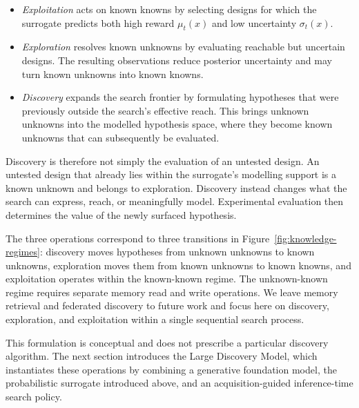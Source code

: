 \begin{itemize}[leftmargin=1.6em,itemsep=2pt,topsep=2pt]
    \item \emph{Exploitation} acts on known knowns by selecting designs for
    which the surrogate predicts both high reward $\mu_t(x)$ and low
    uncertainty $\sigma_t(x)$.

    \item \emph{Exploration} resolves known unknowns by evaluating reachable
    but uncertain designs. The resulting observations reduce posterior
    uncertainty and may turn known unknowns into known knowns.

    \item \emph{Discovery} expands the search frontier by formulating
    hypotheses that were previously outside the search's effective reach.
    This brings unknown unknowns into the modelled hypothesis space, where they
    become known unknowns that can subsequently be evaluated.
\end{itemize}

Discovery is therefore not simply the evaluation of an untested design. An
untested design that already lies within the surrogate's modelling support is
a known unknown and belongs to exploration. Discovery instead changes what
the search can express, reach, or meaningfully model. Experimental evaluation
then determines the value of the newly surfaced hypothesis.

The three operations correspond to three transitions in
Figure~\ref{fig:knowledge-regimes}: discovery moves hypotheses from unknown
unknowns to known unknowns, exploration moves them from known unknowns to
known knowns, and exploitation operates within the known-known regime. The
unknown-known regime requires separate memory read and write operations. We
leave memory retrieval and federated discovery to future work and focus here
on discovery, exploration, and exploitation within a single sequential search
process.

This formulation is conceptual and does not prescribe a particular discovery
algorithm. The next section introduces the Large Discovery Model, which
instantiates these operations by combining a generative foundation model, the
probabilistic surrogate introduced above, and an acquisition-guided
inference-time search policy.


